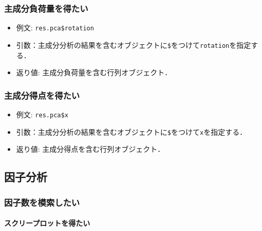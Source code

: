 \documentclass[
  xelatex, ja=standard]{bxjsarticle}
\providecommand{\tightlist}{%
  \setlength{\itemsep}{0pt}\setlength{\parskip}{0pt}}
\begin{document}
\subsubsection{主成分負荷量を得たい}\label{ux4e3bux6210ux5206ux8ca0ux8377ux91cfux3092ux5f97ux305fux3044}

\begin{itemize}
\tightlist
\item
  例文: \texttt{res.pca\$rotation}
\item
  引数：主成分分析の結果を含むオブジェクトに\texttt{\$}をつけて\texttt{rotation}を指定する．
\item
  返り値: 主成分負荷量を含む行列オブジェクト．
\end{itemize}

\subsubsection{主成分得点を得たい}\label{ux4e3bux6210ux5206ux5f97ux70b9ux3092ux5f97ux305fux3044}

\begin{itemize}
\tightlist
\item
  例文: \texttt{res.pca\$x}
\item
  引数：主成分分析の結果を含むオブジェクトに\texttt{\$}をつけて\texttt{x}を指定する．
\item
  返り値: 主成分得点を含む行列オブジェクト．
\end{itemize}

\subsection{因子分析}\label{ux56e0ux5b50ux5206ux6790}

\subsubsection{因子数を模索したい}\label{ux56e0ux5b50ux6570ux3092ux6a21ux7d22ux3057ux305fux3044}

\paragraph{スクリープロットを得たい}\label{ux30b9ux30afux30eaux30fcux30d7ux30edux30c3ux30c8ux3092ux5f97ux305fux3044}
\end{document}
